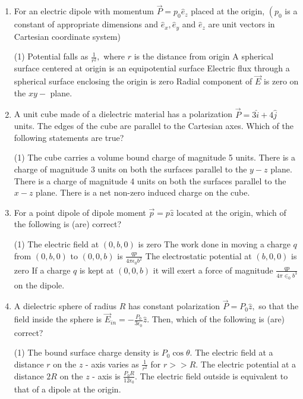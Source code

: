 \begin{enumerate}[label=\color{ocre}\textbf{\arabic*.}]
\item For an electric dipole with momentum $\vec{P}=p_{0} \hat{e}_{z}$ placed at the origin, $\left(p_{0}\right.$ is a constant of appropriate dimensions and $\hat{e}_{x}, \hat{e}_{y}$ and $\hat{e}_{z}$ are unit vectors in Cartesian coordinate system){} 
\begin{tasks}(1)
	\task[\textbf{a.}] Potential falls as $\frac{1}{r^{2}},$ where $r$ is the distance from origin
	\task[\textbf{b.}] A spherical surface centered at origin is an equipotential surface
	\task[\textbf{c.}] Electric flux through a spherical surface enclosing the origin is zero
	\task[\textbf{d.}] Radial component of $\vec{E}$ is zero on the $x y-$ plane.
\end{tasks}
\item A unit cube made of a dielectric material has a polarization $\vec{P}=3 \hat{i}+4 \hat{j}$ units. The edges of the cube are parallel to the Cartesian axes. Which of the following statements are true? {}
\begin{tasks}(1)
	\task[\textbf{a.}] The cube carries a volume bound charge of magnitude 5 units.
	\task[\textbf{b.}] There is a charge of magnitude 3 units on both the surfaces parallel to the $y-z$ plane.
	\task[\textbf{c.}] There is a charge of magnitude 4 units on both the surfaces parallel to the $x-z$ plane.
	\task[\textbf{d.}] There is a net non-zero induced charge on the cube.
\end{tasks}

\item For a point dipole of dipole moment $\vec{p}=p \hat{z}$ located at the origin, which of the following is (are) correct? {}
\begin{tasks}(1)
	\task[\textbf{A.}] The electric field at $(0, b, 0)$ is zero
	\task[\textbf{B.}] The work done in moving a charge $q$ from $(0, b, 0)$ to $(0,0, b)$ is $\frac{q p}{4 \pi \epsilon_{0} b^{2}}$
	\task[\textbf{C.}] The electrostatic potential at $(b, 0,0)$ is zero
	\task[\textbf{D.}] If a charge $q$ is kept at $(0,0, b)$ it will exert a force of magnitude $\frac{q p}{4 \pi \in_{0} b^{3}}$ on the dipole.
\end{tasks}
\item A dielectric sphere of radius $R$ has constant polarization $\vec{P}=P_{0} \hat{z},$ so that the field inside the sphere is $\vec{E}_{i n}=-\frac{P_{0}}{3 \epsilon_{0}} \hat{z} .$ Then, which of the following is (are) correct?{}
\begin{tasks}(1)
	\task[\textbf{a.}] The bound surface charge density is $P_{0} \cos \theta$.
	\task[\textbf{b.}] The electric field at a distance $r$ on the $z$ - axis varies as $\frac{1}{r^{2}}$ for $r>>R$.
	\task[\textbf{c.}] The electric potential at a distance $2 R$ on the $z$ - axis is $\frac{P_{0} R}{12 \epsilon_{0}}$.
	\task[\textbf{d.}] The electric field outside is equivalent to that of a dipole at the origin.
\end{tasks}


\end{enumerate}
